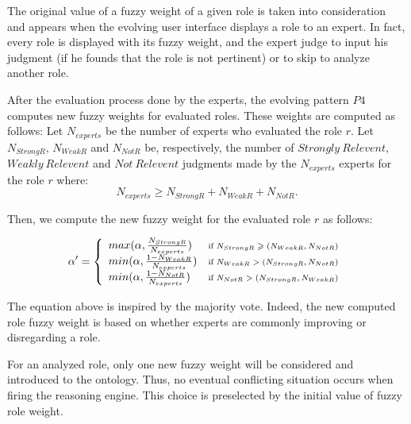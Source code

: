 		The original value of a fuzzy weight of a given role is taken into
		consideration and appears when the evolving user interface displays a role to 
		an expert. In fact, every role is displayed 
		with its fuzzy weight, and the expert judge to input his judgment (if he
		founds that the role is not pertinent) or to skip to analyze another role.
		
		After the evaluation process done by the experts, the evolving pattern $P4$ computes new fuzzy 
		weights for evaluated roles. These weights are computed as follows:
		Let $N_{experts}$ be the number of experts who evaluated the role $r$. Let $N_{StrongR}$, 
		$N_{WeakR}$ and $N_{NotR}$ be, respectively, the number of $Strongly~Relevent$, $Weakly~Relevent$ 
		and $Not~Relevent$ judgments made by the $N_{experts}$ experts for the role $r$ where:
		\begin{equation}
			N_{experts} \geqslant  N_{StrongR} +  N_{WeakR} +  N_{NotR}.
		\end{equation}

		Then, we compute the new fuzzy weight for the evaluated role $r$ as follows:
		
		\begin{equation}
		\alpha'=\left\{
			\begin{array}{l c}
				max(\alpha, \frac{N_{StrongR}}{N_{experts}})	& 
					\text{\scriptsize{if $N_{StrongR} \geqslant (N_{WeakR},N_{NotR})$}} \\
				min(\alpha, \frac{1-N_{WeakR}}{N_{experts}}) & 
					\text{\scriptsize{if $N_{WeakR} > (N_{StrongR},N_{NotR})$}}\\
				min(\alpha, \frac{1-N_{NotR}}{N_{experts}})  &
					\text{\scriptsize{if $N_{NotR} > (N_{StrongR},N_{WeakR})$}}
			\end{array}
		  \right.
		\end{equation}

		The equation above is inspired by the majority vote. Indeed, the new computed role 
		fuzzy weight is based on whether experts are commonly improving or disregarding a role.
		
		For an analyzed role, only one new fuzzy weight will be considered
		and introduced to the ontology. Thus, no eventual conflicting situation 
		occurs when firing the reasoning engine.
		This choice is preselected by the initial value of fuzzy role weight.
	
